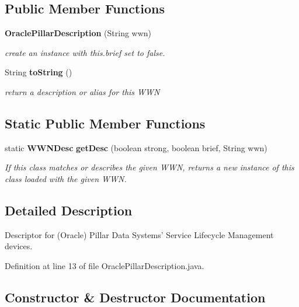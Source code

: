 \subsection*{Public Member Functions}
\begin{DoxyCompactItemize}
\item 
{\bf Oracle\-Pillar\-Description} (String wwn)
\begin{DoxyCompactList}\small\item\em create an instance with this.\-brief set to false. \end{DoxyCompactList}\item 
String {\bf to\-String} ()
\begin{DoxyCompactList}\small\item\em return a description or alias for this W\-W\-N \end{DoxyCompactList}\end{DoxyCompactItemize}
\subsection*{Static Public Member Functions}
\begin{DoxyCompactItemize}
\item 
static {\bf W\-W\-N\-Desc} {\bf get\-Desc} (boolean strong, boolean brief, String wwn)
\begin{DoxyCompactList}\small\item\em If this class matches or describes the given W\-W\-N, returns a new instance of this class loaded with the given W\-W\-N. \end{DoxyCompactList}\end{DoxyCompactItemize}


\subsection{Detailed Description}
Descriptor for (Oracle) Pillar Data Systems' Service Lifecycle Management devices. 

Definition at line 13 of file Oracle\-Pillar\-Description.\-java.



\subsection{Constructor \& Destructor Documentation}
